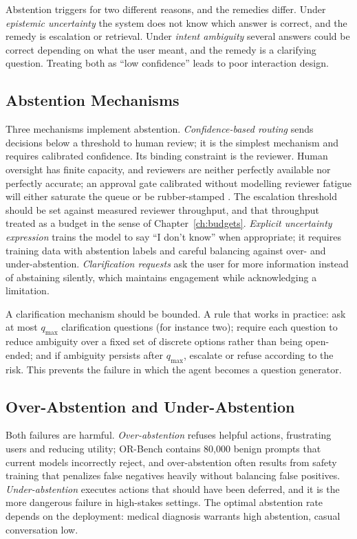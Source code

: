 \documentclass[11pt]{book}
\begin{document}
Abstention triggers for two different reasons, and the remedies differ. Under \textit{epistemic uncertainty} the system does not know which answer is correct, and the remedy is escalation or retrieval. Under \textit{intent ambiguity} several answers could be correct depending on what the user meant, and the remedy is a clarifying question. Treating both as ``low confidence'' leads to poor interaction design.

\subsection{Abstention Mechanisms}

Three mechanisms implement abstention. \textit{Confidence-based routing} sends decisions below a threshold to human review; it is the simplest mechanism and requires calibrated confidence. Its binding constraint is the reviewer. Human oversight has finite capacity, and reviewers are neither perfectly available nor perfectly accurate; an approval gate calibrated without modelling reviewer fatigue will either saturate the queue or be rubber-stamped \cite{oversightcap2026}. The escalation threshold should be set against measured reviewer throughput, and that throughput treated as a budget in the sense of Chapter~\ref{ch:budgets}. \textit{Explicit uncertainty expression} trains the model to say ``I don't know'' when appropriate; it requires training data with abstention labels and careful balancing against over- and under-abstention. \textit{Clarification requests} ask the user for more information instead of abstaining silently, which maintains engagement while acknowledging a limitation.

A clarification mechanism should be bounded. A rule that works in practice: ask at most $q_{\max}$ clarification questions (for instance two); require each question to reduce ambiguity over a fixed set of discrete options rather than being open-ended; and if ambiguity persists after $q_{\max}$, escalate or refuse according to the risk. This prevents the failure in which the agent becomes a question generator.

\subsection{Over-Abstention and Under-Abstention}

Both failures are harmful. \textit{Over-abstention} refuses helpful actions, frustrating users and reducing utility; OR-Bench \cite{cui2024orbench} contains 80{,}000 benign prompts that current models incorrectly reject, and over-abstention often results from safety training that penalizes false negatives heavily without balancing false positives. \textit{Under-abstention} executes actions that should have been deferred, and it is the more dangerous failure in high-stakes settings. The optimal abstention rate depends on the deployment: medical diagnosis warrants high abstention, casual conversation low.
\end{document}
